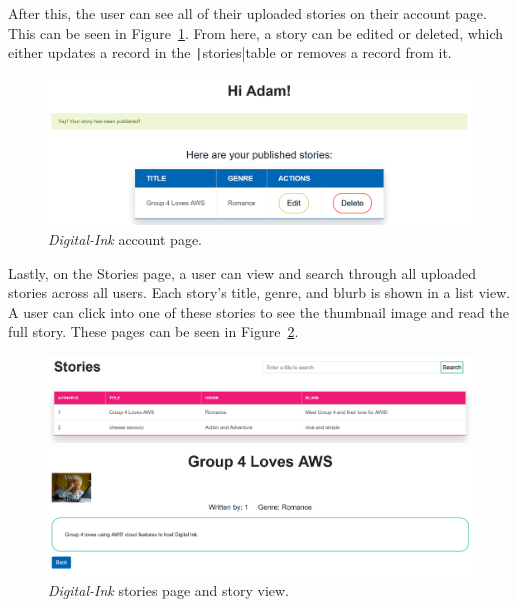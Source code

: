 \clearpage
After this, the user can see all of their uploaded stories on their account page.
This can be seen in Figure~\ref{fig:digital-ink-account}.
From here, a story can be edited or deleted, which either updates a record in the \texttt|stories|table or
removes a record from it.

\begin{figure}[!htbp]
    \centering
    \includegraphics[width=\textwidth]{resources/webapp/digital-ink-account}
    \caption{\textit{Digital-Ink} account page.}
    \label{fig:digital-ink-account}
\end{figure}

Lastly, on the Stories page, a user can view and search through all uploaded stories across all users.
Each story's title, genre, and blurb is shown in a list view.
A user can click into one of these stories to see the thumbnail image and read the full story.
These pages can be seen in Figure~\ref{fig:digital-ink-stories-and-story}.

\begin{figure}[!htbp]
    \centering
    \begin{subfloat}
        \includegraphics[width=\textwidth]{resources/webapp/digital-ink-stories}
    \end{subfloat}
    \begin{subfloat}
        \includegraphics[width=\textwidth]{resources/webapp/digital-ink-story}
    \end{subfloat}
    \caption{\textit{Digital-Ink} stories page and story view.}
    \label{fig:digital-ink-stories-and-story}
\end{figure}
